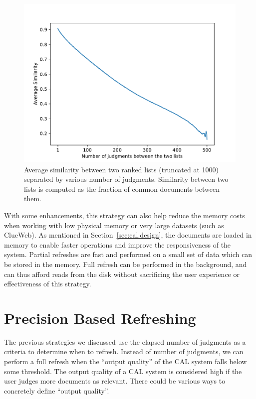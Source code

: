 \begin{figure}[h]
\includegraphics[width=\textwidth]{plots/ranklist_similarity.pdf}
\caption{Average similarity between two ranked lists (truncated at 1000)
separated by various number of judgments. Similarity between two lists is
computed as the fraction of common documents between them.}
\label{plot:partial}
\end{figure}

With some enhancements, this strategy can also help reduce the memory costs
when working with low physical memory or very large datasets (such as ClueWeb).
As mentioned in Section~\ref{sec:cal.design}, the documents are loaded in memory
to enable faster operations and improve the responsiveness of the system.
Partial refreshes are fast and performed on a small set of data which can be
stored in the memory. Full refresh can be performed in the background, and can
thus afford reads from the disk without sacrificing the user experience or
effectiveness of this strategy.

\section{Precision Based Refreshing}

The previous strategies we discussed use the elapsed number of judgments as
a criteria to determine when to refresh. Instead of number of judgments, we can
perform a full refresh when the ``output quality'' of the CAL system falls below
some threshold. The output quality of a CAL system is considered high if the
user judges more documents as relevant. There could be various ways to
concretely define ``output quality''.

